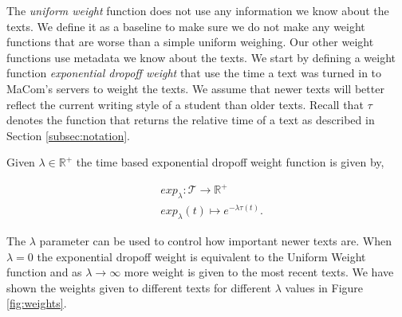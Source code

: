 The \textit{uniform weight} function does not use any information we know about
the texts. We define it as a baseline to make sure we do not make any weight
functions that are worse than a simple uniform weighing. Our other weight
functions use metadata we know about the texts. We start by defining a weight
function \textit{exponential dropoff weight} that use the time a text was turned
in to MaCom's servers to weight the texts. We assume that newer texts will
better reflect the current writing style of a student than older texts. Recall
that $\tau$ denotes the function that returns the relative time of a text as
described in Section \ref{subsec:notation}.

\begin{definition}
    \label{def:exponential_dropoff_weight}

    Given $\lambda \in \mathbb{R}^+$ the time based exponential dropoff weight
    function is given by,

    \begin{align}
        &exp_\lambda \colon \mathcal{T} \rightarrow \mathbb{R}^+ \\
        &exp_\lambda(t) \mapsto e^{-\lambda \tau(t)}.
    \end{align}

\end{definition}

The $\lambda$ parameter can be used to control how important newer texts are.
When $\lambda = 0$ the exponential dropoff weight is equivalent to the Uniform
Weight function and as $\lambda \rightarrow \infty$ more weight is given to
the most recent texts. We have shown the weights given to different texts for
different $\lambda$ values in Figure \ref{fig:weights}.

